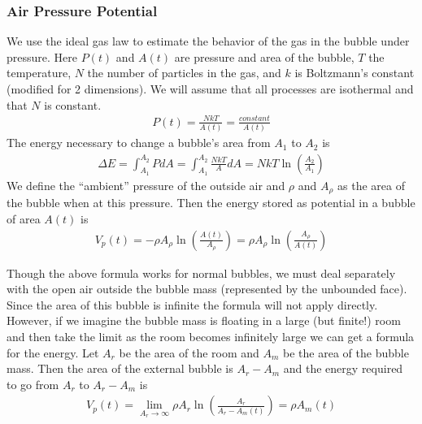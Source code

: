 \documentclass{article}
\begin{document}
\subsubsection{Air Pressure Potential}
We use the ideal gas law to estimate the
behavior of the gas in the bubble under pressure. Here $P(t)$ and $A(t)$ are
pressure and area of the bubble, $T$ the temperature, $N$ the number of particles in the
gas, and $k$ is Boltzmann's constant (modified for 2 dimensions). We will assume
that all processes are isothermal and that $N$ is constant.
\begin{align*}
P(t)=\frac{NkT}{A(t)}=\frac{constant}{A(t)}
\end{align*}
The energy necessary to change a bubble's area from $A_1$ to $A_2$ is
\begin{align*}
\Delta E = \int_{A_1}^{A_2} P dA = \int_{A_1}^{A_2} \frac{NkT}{A} dA = NkT
\ln\left(\frac{A_2}{A_1}\right)
\end{align*}
We define the ``ambient'' pressure of the outside air and $\rho$ and $A_\rho$ as
the area of the bubble when at this pressure. Then the energy stored as
potential in a bubble of area $A(t)$ is
\begin{align*}
V_p(t) = -\rho A_\rho \ln\left(\frac{A(t)}{A_\rho}\right) = \rho A_\rho
\ln\left(\frac{A_\rho}{A(t)}\right)
\end{align*}

Though the above formula works for normal bubbles, we must deal separately with
the open air outside the bubble mass (represented by the unbounded face). Since
the area of this bubble is infinite the formula will not apply directly.
However, if we imagine the bubble mass is floating in a large (but finite!) room
and then take the limit as the room becomes infinitely large we can get a formula
for the energy. Let $A_r$ be the area of the room and $A_m$ be the area of the
bubble mass. Then the area of the external bubble is $A_r-A_m$ and the energy
required to go from $A_r$ to $A_r-A_m$ is
\begin{align*}
V_p(t) = \lim_{A_r\to\infty} \rho A_r \ln\left(\frac{A_r}{A_r-A_m(t)}\right)=
\rho A_m(t)
\end{align*}
\end{document}
